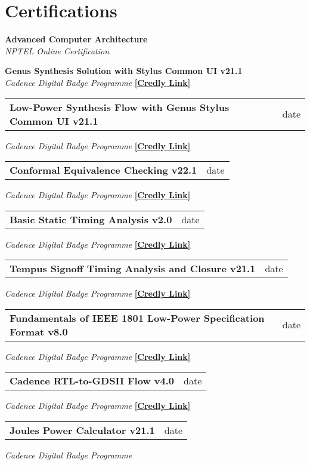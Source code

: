 \section{\sc Certifications}

{\bf{Advanced Computer Architecture }} \\
\textit{NPTEL Online Certification} 


{\bf{Genus Synthesis Solution with Stylus Common UI v21.1}} \\
\textit{Cadence Digital Badge Programme} 
\href{https://www.credly.com/badges/fc9243f2-ca59-4cf6-b2a0-4f01a284d005}{{\bf[Credly Link]}}

\begin{tabular}{@{}p{4in}p{2in}}
  {\bf{Low-Power Synthesis Flow with Genus Stylus Common UI v21.1}}  & date \\
\end{tabular}  
\textit{Cadence Digital Badge Programme} 
\href{}{{\bf[Credly Link]}}

\begin{tabular}{@{}p{4in}p{2in}}
  {\bf{Conformal Equivalence Checking v22.1}}  & date \\
\end{tabular}  
\textit{Cadence Digital Badge Programme} 
\href{}{{\bf[Credly Link]}}

\begin{tabular}{@{}p{4in}p{2in}}
  {\bf{Basic Static Timing Analysis v2.0 }}  & date \\
\end{tabular}  
\textit{Cadence Digital Badge Programme} 
\href{}{{\bf[Credly Link]}}

\begin{tabular}{@{}p{4in}p{2in}}
  {\bf{Tempus Signoff Timing Analysis and Closure v21.1}}  & date \\
\end{tabular}  
\textit{Cadence Digital Badge Programme} 
\href{}{{\bf[Credly Link]}}

\begin{tabular}{@{}p{4in}p{2in}}
  {\bf{Fundamentals of IEEE 1801 Low-Power Specification Format v8.0}}  & date \\
\end{tabular}  
\textit{Cadence Digital Badge Programme} 
\href{}{{\bf[Credly Link]}}

\begin{tabular}{@{}p{4in}p{2in}}
  {\bf{Cadence RTL-to-GDSII Flow v4.0}}  & date \\
\end{tabular}  
\textit{Cadence Digital Badge Programme} 
\href{}{{\bf[Credly Link]}}

\begin{tabular}{@{}p{4in}p{2in}}
  {\bf{Joules Power Calculator v21.1}}  & date \\
\end{tabular}  
\textit{Cadence Digital Badge Programme} 
\endinput
